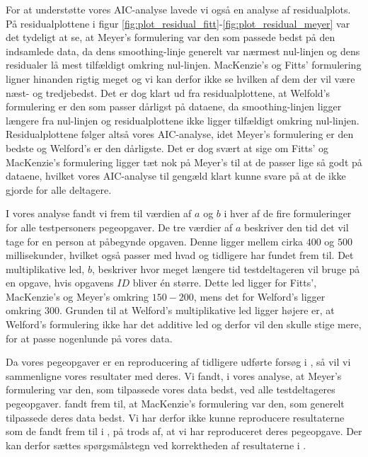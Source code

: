 For at understøtte vores AIC-analyse lavede vi også en analyse af residualplots. På residualplottene i figur \ref{fig:plot_residual_fitt}-\ref{fig:plot_residual_meyer} var det tydeligt at se, at Meyer's formulering var den som passede bedst på den indsamlede data, da dens smoothing-linje generelt var nærmest nul-linjen og dens residualer lå mest tilfældigt omkring nul-linjen. MacKenzie's og Fitts' formulering ligner hinanden rigtig meget og vi kan derfor ikke se hvilken af dem der vil være næst- og tredjebedst. Det er dog klart ud fra residualplottene, at Welfold's formulering er den som passer dårligst på dataene, da smoothing-linjen ligger længere fra nul-linjen og residualplottene ikke ligger tilfældigt omkring nul-linjen. Residualplottene følger altså vores AIC-analyse, idet Meyer's formulering er den bedste og Welford's er den dårligste. Det er dog svært at sige om Fitts' og MacKenzie's formulering ligger tæt nok på Meyer's til at de passer lige så godt på dataene, hvilket vores AIC-analyse til gengæld klart kunne svare på at de ikke gjorde for alle deltagere.

I vores analyse fandt vi frem til værdien af $a$ og $b$ i hver af de fire formuleringer for alle testpersoners pegeopgaver. De tre værdier af $a$ beskriver den tid det vil tage for en person at påbegynde opgaven. Denne ligger mellem cirka $400$ og $500$ millisekunder, hvilket også passer med hvad \cite{crossman1957} og \cite{welford1968} tidligere har fundet frem til. Det multiplikative led, $b$, beskriver hvor meget længere tid testdeltageren vil bruge på en opgave, hvis opgavens $ID$ bliver én større. Dette led ligger for Fitts', MacKenzie's og Meyer's omkring $150-200$, mens det for Welford's ligger omkring $300$. Grunden til at Welford's multiplikative led ligger højere er, at Welford's formulering ikke har det additive led og derfor vil den skulle stige mere, for at passe nogenlunde på vores data.

Da vores pegeopgaver er en reproducering af tidligere udførte forsøg i \cite{goldberg2015}, så vil vi sammenligne vores resultater med deres. Vi fandt, i vores analyse, at Meyer's formulering var den, som tilpassede vores data bedst, ved alle testdeltageres pegeopgaver. \cite{goldberg2015} fandt frem til, at MacKenzie's formulering var den, som generelt tilpassede deres data bedst. Vi har derfor ikke kunne reproducere resultaterne som de fandt frem til i \cite{goldberg2015}, på trods af, at vi har reproduceret deres pegeopgave. Der kan derfor sættes spørgsmålstegn ved korrektheden af resultaterne i \cite{goldberg2015}.

